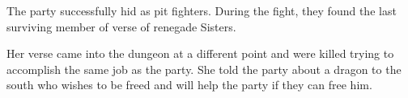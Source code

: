 The party successfully hid as pit fighters.
During the fight, they found the last surviving member of verse of renegade Sisters.

Her verse came into the dungeon at a different point and were killed trying to accomplish the same job as the party.
She told the party about a dragon to the south who wishes to be freed and will help the party if they can free him.
